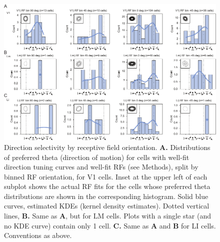 \begin{figure}[hbt!]
\includegraphics[width=\textwidth]{figures/supplemental/fig_s12_theta_vs_rf/fig_s12_theta_vs_rf.pdf}
    \centering
    \caption[Direction selectivity and RF orientation]{Direction selectivity by receptive field orientation.
    \textbf{A.} Distributions of preferred theta (direction of motion) for cells with well-fit direction tuning curves and well-fit RFs (see Methods), split by binned RF orientation, for V1 cells. Inset at the upper left of each subplot shows the actual RF fits for the cells whose preferred theta distributions are shown in the corresponding histogram. Solid blue curves, estimated KDEs (kernel density estimates). Dotted vertical lines, 
    \textbf{B.} Same as \textbf{A}, but for LM cells. Plots with a single star (and no KDE curve) contain only 1 cell. 
    \textbf{C.} Same as \textbf{A} and \textbf{B} for LI cells. Conventions as above.
    \label{supfig:theta_vs_rf}}
\end{figure}


